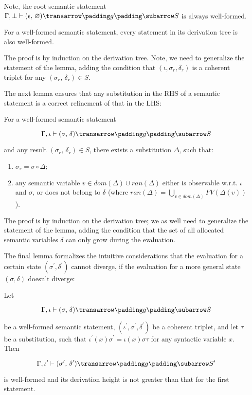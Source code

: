 Note, the root semantic statement \mbox{$\otrans{\Gamma,\bot}{(\epsilon,\,\emptyset)}{g}{S}$} is always well-formed.

\begin{lemma}
\label{one}
\normalfont
 For a well-formed semantic statement, every statement in its derivation tree is also well-formed.
\end{lemma}

The proof is by induction on the derivation tree. Note, we need to generalize the statement of the lemma, adding the condition that
\mbox{$(\iota,\sigma_r,\delta_r)$} is a coherent triplet for any \mbox{$(\sigma_r,\,\delta_r) \in S$}.

The next lemma ensures that any substitution in the RHS of a semantic statement is a correct refinement of that in the LHS:

\begin{lemma}
\label{two}
\normalfont
For a well-formed semantic statement 

$$
\otrans{\Gamma,\iota}{(\sigma,\,\delta)}{g}{S}
$$ 

\noindent and any result \mbox{$(\sigma_r,\,\delta_r) \in S$}, there exists a substitution $\Delta$, such that:
  \begin{enumerate}
    \item \mbox{$\sigma_r = \sigma\circ\Delta$};
    \item any semantic variable \mbox{$v\in dom(\Delta)\cup ran(\Delta)$} either is observable w.r.t. $\iota$ and $\sigma$,
 or does not belong to $\delta$ (where \mbox{$ran(\Delta)=\bigcup_{v\in dom(\Delta)}FV(\Delta(v))$}).
  \end{enumerate}   
\end{lemma}

The proof is by induction on the derivation tree; we as well need to generalize the statement of the lemma, adding the condition that the 
set of all allocated semantic variables $\delta$ can only grow during the evaluation.

The final lemma formalizes the intuitive considerations that the evaluation for a certain state $(\sigma^\prime,\delta^\prime)$ cannot
diverge, if the evaluation for a more general state $(\sigma,\delta)$ doesn't diverge:

\begin{lemma}
\label{three}
\normalfont
Let 

$$
\otrans{\Gamma,\iota}{(\sigma,\,\delta)}{g}{S}
$$ 

\noindent be a well-formed semantic statement, \mbox{$(\iota^\prime,\sigma^\prime,\delta^\prime)$} be a coherent triplet,
and let $\tau$ be a substitution, such that \mbox{$\iota^\prime(x) \sigma^\prime = \iota(x) \sigma \tau$} for any syntactic
variable $x$. Then

$$
\otrans{\Gamma,\iota^\prime}{(\sigma^\prime,\,\delta^\prime)}{g}{S^\prime}
$$

\noindent is well-formed and its derivation height is not greater than that for the first statement.
\end{lemma}

